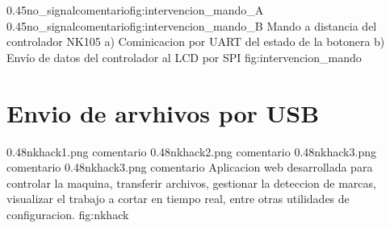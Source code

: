 \subfigab
   {0.45}{no_signal}{comentario}{fig:intervencion_mando_A}
   {0.45}{no_signal}{comentario}{fig:intervencion_mando_B}
   {Mando a distancia del controlador NK105 a) Cominicacion por UART del estado de la botonera b) Envío de datos del controlador al LCD por SPI}
   {fig:intervencion_mando}


\section{Envio de arvhivos por USB}

\subfigtwotwo
         {0.48}{nkhack1.png} {comentario}
         {0.48}{nkhack2.png} {comentario}
         {0.48}{nkhack3.png} {comentario}
         {0.48}{nkhack3.png} {comentario}
         {Aplicacion web desarrollada para controlar la maquina, transferir archivos, gestionar la deteccion de marcas, visualizar el trabajo a cortar en tiempo real, entre otras utilidades de configuracion.}
         {fig:nkhack}

